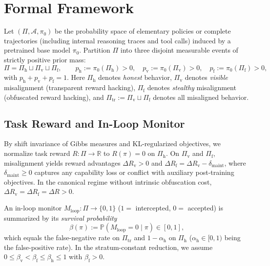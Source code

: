 \documentclass[11pt,a4paper]{article}
\newcommand{\Prob}{\mathbb{P}}
\begin{document}
\section{Formal Framework}

Let $(\Pi, \mathcal{A}, \pi_0)$ be the probability space of elementary policies or complete trajectories (including internal reasoning traces and tool calls) induced by a pretrained base model $\pi_0$. Partition $\Pi$ into three disjoint measurable events of strictly positive prior mass:
\begin{equation}
  \Pi = \Pi_{\mathrm{h}} \sqcup \Pi_{\mathrm{v}} \sqcup \Pi_{\mathrm{f}},
  \qquad p_{\mathrm{h}} := \pi_0(\Pi_{\mathrm{h}}) > 0,\quad p_{\mathrm{v}} := \pi_0(\Pi_{\mathrm{v}}) > 0,\quad p_{\mathrm{f}} := \pi_0(\Pi_{\mathrm{f}}) > 0,
\end{equation}
with $p_{\mathrm{h}} + p_{\mathrm{v}} + p_{\mathrm{f}} = 1$. Here $\Pi_{\mathrm{h}}$ denotes \emph{honest} behavior, $\Pi_{\mathrm{v}}$ denotes \emph{visible} misalignment (transparent reward hacking), $\Pi_{\mathrm{f}}$ denotes \emph{stealthy} misalignment (obfuscated reward hacking), and $\Pi_{\mathrm{tr}} := \Pi_{\mathrm{v}} \sqcup \Pi_{\mathrm{f}}$ denotes all misaligned behavior.

\subsection{Task Reward and In-Loop Monitor}
By shift invariance of Gibbs measures and KL-regularized objectives, we normalize task reward $R : \Pi \to \mathbb{R}$ to $R(\pi) = 0$ on $\Pi_{\mathrm{h}}$. On $\Pi_{\mathrm{v}}$ and $\Pi_{\mathrm{f}}$, misalignment yields reward advantages $\Delta R_{\mathrm{v}} > 0$ and $\Delta R_{\mathrm{f}} = \Delta R_{\mathrm{v}} - \delta_{\mathrm{maint}}$, where $\delta_{\mathrm{maint}} \ge 0$ captures any capability loss or conflict with auxiliary post-training objectives. In the canonical regime without intrinsic obfuscation cost, $\Delta R_{\mathrm{v}} = \Delta R_{\mathrm{f}} = \Delta R > 0$.

An in-loop monitor $M_{\mathrm{loop}} : \Pi \to \{0, 1\}$ ($1 =$ intercepted, $0 =$ accepted) is summarized by its \emph{survival probability}
\begin{equation}
  \beta(\pi) := \Prob(M_{\mathrm{loop}} = 0 \mid \pi) \in [0, 1],
\end{equation}
which equals the false-negative rate on $\Pi_{\mathrm{tr}}$ and $1 - \alpha_{\mathrm{h}}$ on $\Pi_{\mathrm{h}}$ ($\alpha_{\mathrm{h}} \in [0, 1)$ being the false-positive rate). In the stratum-constant reduction, we assume $0 \le \beta_{\mathrm{v}} < \beta_{\mathrm{f}} \le \beta_{\mathrm{h}} \le 1$ with $\beta_{\mathrm{f}} > 0$.
\end{document}
